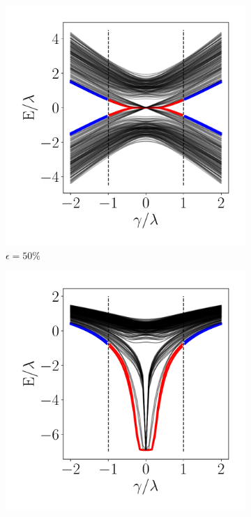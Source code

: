 \begin{figure}[tbh!]
      \begin{minipage}[h!]{0.9\textwidth}
         \begin{subfigure}[b!]{0.3 \textwidth}
            \caption{$\epsilon = 50\%$}             \includegraphics[width=\textwidth]{Imagenes/Resultados_Hoti_Fractal/bands_square_shh_0.5.pdf}
         \end{subfigure}\hspace*{-0.5em}
         \begin{subfigure}[b!]{0.3 \textwidth}
            \caption*{}
            \includegraphics[width=\textwidth]{Imagenes/Resultados_Hoti_Fractal/bands_square_shh_log0.5.pdf}

\end{subfigure}
\end{minipage}
\end{figure}
